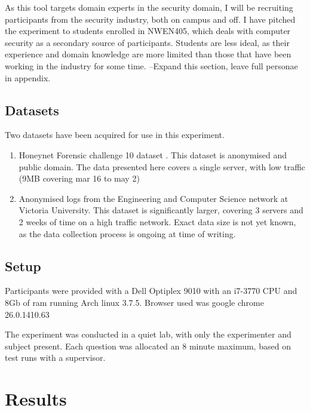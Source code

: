 As this tool targets domain experts in the security domain, I will be recruiting participants from the security industry, both on campus and off. I have pitched the experiment to students enrolled in NWEN405, which deals with computer security as a secondary source of participants. Students are less ideal, as their experience and domain knowledge are more limited than those that have been working in the industry for some time.
--Expand this section, leave full personae in appendix.

\subsection{Datasets}

Two datasets have been acquired for use in this experiment.
\begin{enumerate}
\item{Honeynet Forensic challenge 10 dataset \cite{forensic10}. This dataset is anonymised and public domain. The data presented here covers a single server, with low traffic (9MB covering mar 16 to may 2)}
\item{Anonymised logs from the Engineering and Computer Science network at Victoria University. This dataset is significantly larger, covering 3 servers and 2 weeks of time on a high traffic network. Exact data size is not yet known, as the data collection process is ongoing at time of writing.}
\end{enumerate}

\subsection{Setup}
Participants were provided with a Dell Optiplex 9010 with an i7-3770 CPU and 8Gb of ram running Arch linux 3.7.5.
Browser used was google chrome 26.0.1410.63

The experiment was conducted in a quiet lab, with only the experimenter and subject present. Each question was allocated an 8 minute maximum, based on test runs with a supervisor.

\section{Results}

